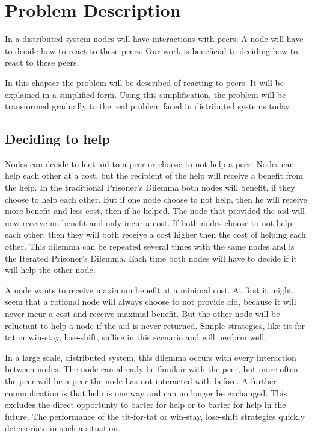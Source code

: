 \chapter{Problem Description}
In a distributed system nodes will have interactions with peers.
A node will have to decide how to react to these peers.
Our work is beneficial to deciding how to react to these peers.

In this chapter the problem will be described of reacting to peers.
It will be explained in a simplified form.
Using this simplification, the problem will be transformed gradually
to the real problem faced in distributed systems today.

\section{Deciding to help}
Nodes can decide to lent aid to a peer or choose to not help a peer.
Nodes can help each other at a cost, but the recipient of the help will receive a benefit from the help.
In the traditional Prisoner's Dilemma\cite{Nowak-PrisonerDilemma} both nodes will benefit, if they choose to help each other.
But if one node choose to not help, then he will receive more benefit and less cost, then if he helped.
The node that provided the aid will now receive no benefit and only incur a cost.
If both nodes choose to not help each other, 
then they will both receive a cost higher then the cost of helping each other.
This dilemma can be repeated several times with the same nodes and is the Iterated Prisoner's Dilemma.
Each time both nodes will have to decide if it will help the other node.

A node wants to receive maximum benefit at a minimal cost.
At first it might seem that a rational node will always choose to not provide aid,
because it will never incur a cost and receive maximal benefit.
But the other node will be reluctant to help a node if the aid is never returned.
Simple strategies, like tit-for-tat or win-stay, lose-shift, suffice in this scenario
and will perform well\cite{Nowak-Cooperation}.

In a large scale, distributed system, this dilemma occurs with every interaction between nodes.
The node can already be familair with the peer,
but more often the peer will be a peer the node has not interacted with before.
A further commplication is that help is one way and can no longer be exchanged.
This excludes the direct opportunty to barter for help or to barter for help in the future.
The performance of the tit-for-tat or win-stay, lose-shift strategies
quickly deterioriate in such a situation.

